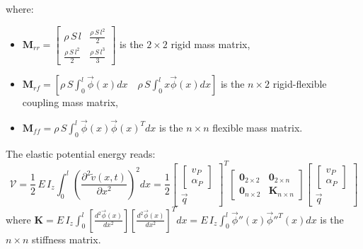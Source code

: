\documentclass[smallcondensed]{svjour3}     %
\begin{document}
where:
\begin{itemize}
\item $\mathbf{M}_{rr}=\left[\begin{array}{cc}\scriptstyle{\rho\,S\,l} & \frac{\rho\,S\,l^2}{2} \\ \frac{\rho\,S\,l^2}{2} &\frac{\rho\,S\,l^3}{3} \end{array}\right]$ is the $2\times 2$ rigid mass matrix,
\item $\mathbf{M}_{rf}=[\rho\,S\int_0^l\vec{\phi}(x)dx\quad \rho\,S\int_0^lx\vec{\phi}(x)dx]$ is the $n\times 2$ rigid-flexible coupling mass matrix,
\item $\mathbf{M}_{ff}=\rho\,S\int_0^l\vec{\phi}(x)\vec{\phi}(x)^Tdx$ is the $n\times n$ flexible mass matrix.
\end{itemize}
The elastic potential energy reads:
\[ \mathcal{V}= \frac{1}{2}\,E\,I_z\int_0^l\left(\frac{\partial^2 \widetilde{v}(x,t)}{\partial x^2}\right)^2dx=\frac{1}{2}\left[\begin{array}{c}\left[\begin{array}{c}v_P\\ \alpha_P\end{array}\right] \\ \vec{q} \end{array}\right]^T\left[\begin{array}{cc}\mathbf{0}_{2\times 2} &  \mathbf{0}_{2\times n}\\ \mathbf{0}_{n\times 2} & \mathbf{K}_{n\times n} \end{array}\right]\left[\begin{array}{c} \left[\begin{array}{c} v_P\\ \alpha_P\end{array}\right]\\ \vec{q} \end{array}\right]\]
where $\mathbf{K}=E\,I_z\int_0^l\left[\frac{d^2\vec{\phi}(x)}{dx^2}\right]\left[\frac{d^2\vec{\phi}(x)}{dx^2}\right]^Tdx=E\,I_z\int_0^l\vec{\phi}''(x)\vec{\phi}''^T(x)dx$ is the $n\times n$ stiffness matrix.
\end{document}
